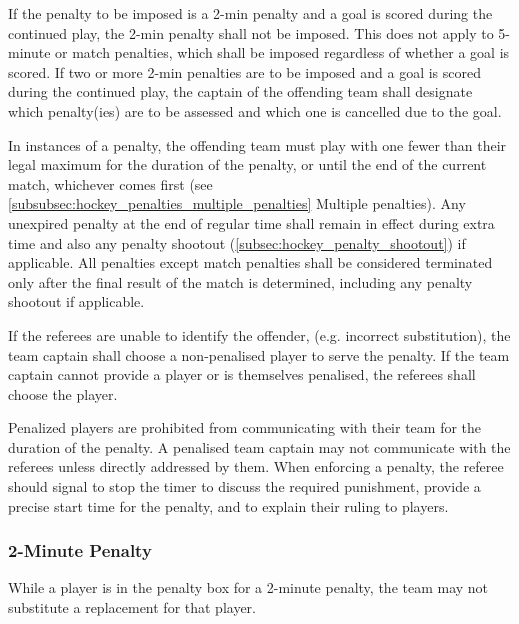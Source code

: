 If the penalty to be imposed is a 2-min penalty and a goal is scored during the continued play, the 2-min penalty shall not be imposed.
This does not apply to 5-minute or match penalties, which shall be imposed regardless of whether a goal is scored.
If two or more 2-min penalties are to be imposed and a goal is scored during the continued play, the captain of the offending team shall designate which penalty(ies) are to be assessed and which one is cancelled due to the goal.

In instances of a penalty, the offending team must play with one fewer than their legal maximum for the duration of the penalty, or until the end of the current match, whichever comes first (see \ref{subsubsec:hockey_penalties_multiple_penalties} Multiple penalties).
Any unexpired penalty at the end of regular time shall remain in effect during extra time and also any penalty shootout (\ref{subsec:hockey_penalty_shootout}) if applicable.
All penalties except match penalties shall be considered terminated only after the final result of the match is determined, including any penalty shootout if applicable.

If the referees are unable to identify the offender, (e.g. incorrect substitution), the team captain shall choose a non-penalised player to serve the penalty.
If the team captain cannot provide a player or is themselves penalised, the referees shall choose the player.

Penalized players are prohibited from communicating with their team for the duration of the penalty.
A penalised team captain may not communicate with the referees unless directly addressed by them.
When enforcing a penalty, the referee should signal to stop the timer to discuss the required punishment, provide a precise start time for the penalty, and to explain their ruling to players.

\subsubsection{2-Minute Penalty}
While a player is in the penalty box for a 2-minute penalty, the team may not substitute a replacement for that player.


